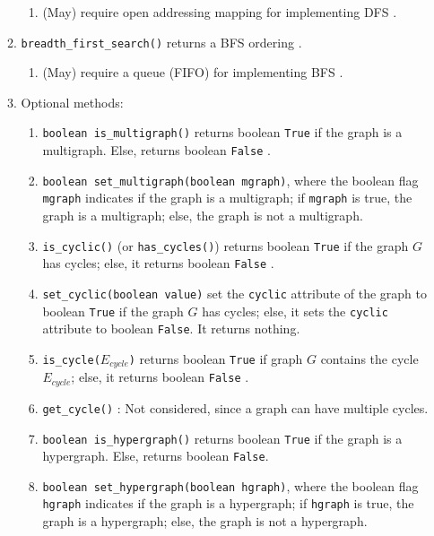 \begin{enumerate}
\begin{enumerate}
		\begin{enumerate} \itemsep -2pt
		\item (May) require open addressing mapping for implementing DFS \cite[\S53, pp. 857]{Goldman2008}.
		\end{enumerate}
	\item {\tt breadth\_first\_search()} returns a BFS ordering \cite{WikipediaContributors2019}.\vspace{-0.2cm}
		\begin{enumerate} \itemsep -2pt
		\item (May) require a queue (FIFO) for implementing BFS \cite[\S53, pp. 857]{Goldman2008}.
		\end{enumerate}
	\item Optional methods: \vspace{-0.2cm}
		\begin{enumerate} %
		\item {\tt boolean is\_multigraph()} returns boolean {\tt True} if the graph is a multigraph. Else, returns boolean {\tt False} \cite[\S52.4, pp. 849]{Goldman2008}.
		\item {\tt boolean set\_multigraph(boolean mgraph)}, where the boolean flag {\tt mgraph} indicates if the graph is a multigraph; if {\tt mgraph} is true, the graph is a multigraph; else, the graph is not a multigraph.
		\item {\tt is\_cyclic()} (or {\tt has\_cycles()}) returns boolean {\tt True} if the graph $G$ has cycles; else, it returns boolean {\tt False} \cite[\S52.4, pp. 850]{Goldman2008}.
		\item {\tt set\_cyclic(boolean value)} set the {\tt cyclic} attribute of the graph to boolean {\tt True} if the graph $G$ has cycles; else, it sets the {\tt cyclic} attribute to boolean {\tt False}. It returns nothing.
		\item {\tt is\_cycle($E_{cycle}$)} returns boolean {\tt True} if graph $G$ contains the cycle $E_{cycle}$; else, it returns boolean {\tt False} \cite[\S52.4, pp. 850]{Goldman2008}.
		\item {\tt get\_cycle()} \cite[\S52.4, pp. 850]{Goldman2008}: Not considered, since a graph can have multiple cycles.
		\item {\tt boolean is\_hypergraph()} returns boolean {\tt True} if the graph is a hypergraph. Else, returns boolean {\tt False}.
		\item {\tt boolean set\_hypergraph(boolean hgraph)}, where the boolean flag {\tt hgraph} indicates if the graph is a hypergraph; if {\tt hgraph} is true, the graph is a hypergraph; else, the graph is not a hypergraph.

\end{enumerate}
\end{enumerate}
\end{enumerate}
